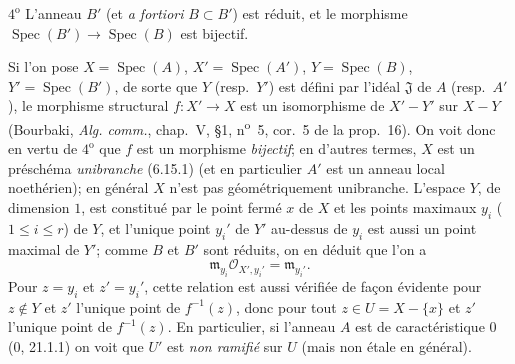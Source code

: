 $4^{\mathrm o}$ L'anneau $B'$ (et \emph{a fortiori} $B\subset B'$) est réduit, et le
morphisme $\operatorname{Spec}(B')\to\operatorname{Spec}(B)$ est bijectif.

Si l'on pose $X=\operatorname{Spec}(A)$, $X'=\operatorname{Spec}(A')$,
$Y=\operatorname{Spec}(B)$, $Y'=\operatorname{Spec}(B')$, de sorte que $Y$
(resp.\ $Y'$) est défini par l'idéal $\mathfrak J$ de $A$ (resp.\ $A'$), le morphisme
structural $f:X'\to X$ est un isomorphisme de $X'-Y'$ sur $X-Y$ (Bourbaki,
\emph{Alg. comm.}, chap.~V, \S1, n\textsuperscript{o}~5, cor.~5 de la prop.~16). On
voit donc en vertu de $4^{\mathrm o}$ que $f$ est un morphisme \emph{bijectif}; en
d'autres termes, $X$ est un préschéma \emph{unibranche} (6.15.1) (et en particulier
$A'$ est un anneau local noethérien); en général $X$ n'est pas géométriquement
unibranche. L'espace $Y$, de dimension $1$, est constitué par le point fermé $x$ de
$X$ et les points maximaux $y_i$ ($1\leq i\leq r$) de $Y$, et l'unique point $y_i'$
de $Y'$ au-dessus de $y_i$ est aussi un point maximal de $Y'$; comme $B$ et $B'$ sont
réduits, on en déduit que l'on a
\[
  \mathfrak m_{y_i}\mathcal O_{X',y_i'}=\mathfrak m_{y_i'}.
\]
Pour $z=y_i$ et $z'=y_i'$, cette relation est aussi vérifiée de façon évidente pour
$z\notin Y$ et $z'$ l'unique point de $f^{-1}(z)$, donc pour tout
$z\in U=X-\{x\}$ et $z'$ l'unique point de $f^{-1}(z)$. En particulier, si l'anneau
$A$ est de caractéristique $0$ (0, 21.1.1) on voit que $U'$ est \emph{non ramifié} sur
$U$ (mais non étale en général).


